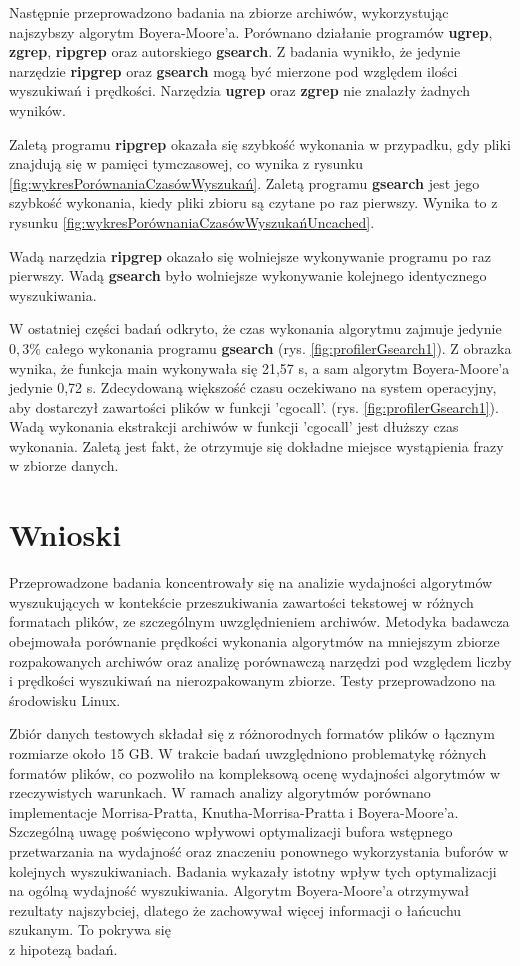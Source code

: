 Następnie przeprowadzono badania na zbiorze archiwów, wykorzystując najszybszy algorytm 
Boyera-Moore'a. Porównano działanie programów \textbf{ugrep}, \textbf{zgrep},
\textbf{ripgrep} oraz autorskiego \textbf{gsearch}. Z badania wynikło, że
jedynie narzędzie \textbf{ripgrep} oraz \textbf{gsearch} mogą być mierzone pod
względem ilości wyszukiwań i prędkości. Narzędzia \textbf{ugrep} oraz 
\textbf{zgrep} nie znalazły żadnych wyników. 

Zaletą programu \textbf{ripgrep} okazała się szybkość wykonania w przypadku, gdy
pliki znajdują się w pamięci tymczasowej, co wynika z rysunku 
\ref{fig:wykresPorównaniaCzasówWyszukań}. Zaletą programu \textbf{gsearch} jest
jego szybkość wykonania, kiedy pliki zbioru są czytane po raz pierwszy. Wynika
to z rysunku \ref{fig:wykresPorównaniaCzasówWyszukańUncached}. 

Wadą narzędzia \textbf{ripgrep} okazało się wolniejsze wykonywanie programu po raz pierwszy.
Wadą \textbf{gsearch} było wolniejsze wykonywanie kolejnego identycznego wyszukiwania.

W ostatniej części badań odkryto, że czas wykonania algorytmu zajmuje jedynie
$0,3 \%$ całego wykonania programu \textbf{gsearch} (rys. \ref{fig:profilerGsearch1}).
Z obrazka wynika, że funkcja main wykonywała się 21,57 s, a sam algorytm 
Boyera-Moore'a jedynie 0,72 s. Zdecydowaną większość czasu oczekiwano na 
system operacyjny, aby dostarczył zawartości plików w funkcji 'cgocall'. 
(rys. \ref{fig:profilerGsearch1}). Wadą wykonania ekstrakcji archiwów w funkcji 
'cgocall' jest dłuższy czas wykonania. Zaletą jest fakt, że otrzymuje się 
dokładne miejsce wystąpienia frazy w zbiorze danych.

\section{Wnioski}

Przeprowadzone badania koncentrowały się na analizie wydajności algorytmów 
wyszukujących w kontekście przeszukiwania zawartości tekstowej w różnych formatach 
plików, ze szczególnym uwzględnieniem archiwów. Metodyka badawcza obejmowała porównanie
prędkości wykonania algorytmów na mniejszym zbiorze rozpakowanych archiwów oraz 
analizę porównawczą narzędzi pod względem liczby i prędkości wyszukiwań na 
nierozpakowanym zbiorze. Testy przeprowadzono na środowisku Linux.
 
Zbiór danych testowych składał się z różnorodnych formatów plików o łącznym 
rozmiarze około 15 GB. W trakcie badań
uwzględniono problematykę różnych formatów plików, co pozwoliło na kompleksową
ocenę wydajności algorytmów w rzeczywistych warunkach. W ramach analizy
algorytmów porównano implementacje Morrisa-Pratta, Knutha-Morrisa-Pratta i Boyera-Moore'a.
Szczególną uwagę poświęcono wpływowi optymalizacji bufora wstępnego przetwarzania
na wydajność oraz znaczeniu ponownego wykorzystania buforów w kolejnych wyszukiwaniach.
Badania wykazały istotny wpływ tych optymalizacji na ogólną wydajność wyszukiwania.
Algorytm Boyera-Moore'a otrzymywał rezultaty najszybciej, dlatego że zachowywał więcej 
informacji o łańcuchu szukanym. To pokrywa się \\ z hipotezą badań.

